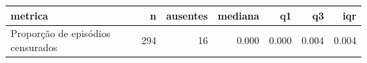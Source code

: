 \begin{tabular}{lrrrrrr}
\toprule
metrica & n & ausentes & mediana & q1 & q3 & iqr \\
\midrule
Proporção de episódios censurados & 294 & 16 & 0.000 & 0.000 & 0.004 & 0.004 \\
\bottomrule
\end{tabular}
